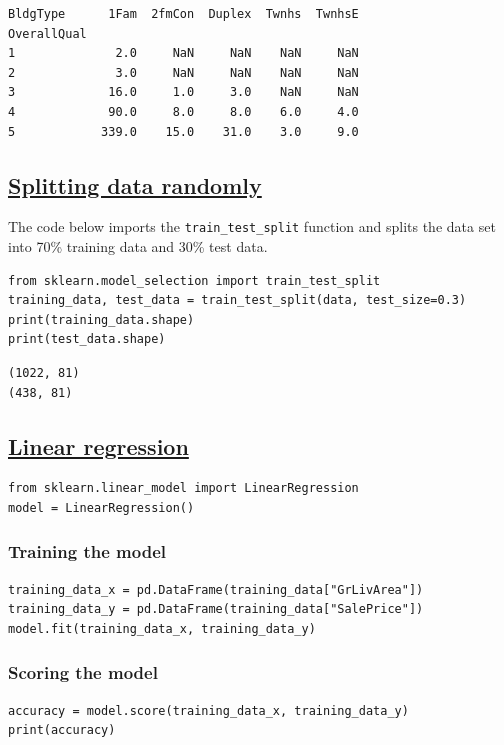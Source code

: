 \documentclass[11pt]{article}
\begin{document}
\begin{verbatim}
BldgType      1Fam  2fmCon  Duplex  Twnhs  TwnhsE
OverallQual
1              2.0     NaN     NaN    NaN     NaN
2              3.0     NaN     NaN    NaN     NaN
3             16.0     1.0     3.0    NaN     NaN
4             90.0     8.0     8.0    6.0     4.0
5            339.0    15.0    31.0    3.0     9.0
\end{verbatim}


 \newpage
\subsection{\href{https://scikit-learn.org/stable/modules/generated/sklearn.model\_selection.train\_test\_split.html}{Splitting data randomly}}
\label{sec:org6f0232d}
The code below imports the \texttt{train\_test\_split} function and splits the data set into 70\% training data and 30\% test data.
\begin{verbatim}
from sklearn.model_selection import train_test_split
training_data, test_data = train_test_split(data, test_size=0.3)
print(training_data.shape)
print(test_data.shape)
\end{verbatim}

\label{org88eddc9}
\begin{verbatim}
(1022, 81)
(438, 81)
\end{verbatim}
\subsection{\href{https://scikit-learn.org/stable/modules/generated/sklearn.linear\_model.LinearRegression.html}{Linear regression}}
\label{sec:orgd3becf2}
\begin{verbatim}
from sklearn.linear_model import LinearRegression
model = LinearRegression()
\end{verbatim}
\subsubsection{Training the model}
\label{sec:org825da61}
\begin{verbatim}
training_data_x = pd.DataFrame(training_data["GrLivArea"])
training_data_y = pd.DataFrame(training_data["SalePrice"])
model.fit(training_data_x, training_data_y)
\end{verbatim}
\subsubsection{Scoring the model}
\label{sec:org398e0b9}
\begin{verbatim}
accuracy = model.score(training_data_x, training_data_y)
print(accuracy)
\end{verbatim}
\end{document}
